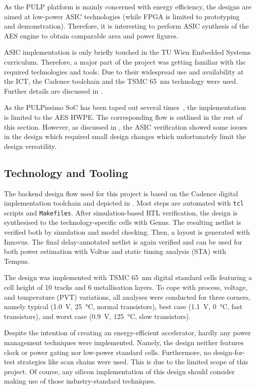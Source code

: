 \documentclass[a4paper, 12pt]{article}
\begin{document}
As the PULP platform is mainly concerned with energy efficiency, the designs are aimed at low-power ASIC technologies (while FPGA is limited to prototyping and demonstration). Therefore, it is interesting to perform ASIC synthesis of the AES engine to obtain comparable area and power figures.

ASIC implementation is only briefly touched in the TU Wien Embedded Systems curriculum. Therefore, a major part of the project was getting familiar with the required technologies and tools. Due to their widespread use and availability at the ICT, the Cadence toolchain and the TSMC \SI{65}{nm} technology were used. Further details are discussed in .

As the PULPissimo SoC has been taped out several times~\cite{pulp-chips}, the implementation is limited to the AES HWPE. The corresponding flow is outlined in the rest of this section. However, as discussed in , the ASIC verification showed some issues in the design which required small design changes which unfortunately limit the design versatility.

\subsection{Technology and Tooling} \label{sec:asic:tools}

The backend design flow used for this project is based on the Cadence digital implementation toolchain and depicted in . Most steps are automated with \texttt{tcl} scripts and \texttt{Makefiles}. After simulation-based RTL verification, the design is synthesised to the technology-specific cells with Genus. The resulting netlist is verified both by simulation and model checking. Then, a layout is generated with Innovus. The final delay-annotated netlist is again verified and can be used for both power estimation with Voltus and static timing analysis (STA) with Tempus.

The design was implemented with TSMC \SI{65}{nm} digital standard cells featuring a cell height of 10 tracks and 6 metallisation layers. To cope with process, voltage, and temperature (PVT) variations, all analyses were conducted for three corners, namely typical (\SI{1.0}{V}, \SI{25}{\degreeCelsius}, normal transistors), best case (\SI{1.1}{V}, \SI{0}{\degreeCelsius}, fast transistors), and worst case (\SI{0.9}{V}, \SI{125}{\degreeCelsius}, slow transistors).

Despite the intention of creating an energy-efficient accelerator, hardly any power management techniques were implemented. Namely, the design neither features clock or power gating nor low-power standard cells. Furthermore, no design-for-test strategies like scan chains were used. This is due to the limited scope of this project. Of course, any silicon implementation of this design should consider making use of those industry-standard techniques.
\end{document}
